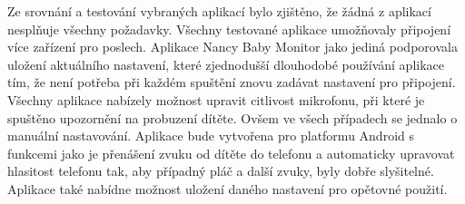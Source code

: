 \documentclass[journal, a4paper]{IEEEtran}
\begin{document}
Ze srovnání a testování vybraných aplikací bylo zjištěno, že žádná z aplikací nesplňuje všechny požadavky. Všechny testované aplikace umožňovaly připojení více zařízení pro poslech. Aplikace Nancy Baby Monitor jako jediná podporovala uložení aktuálního nastavení, které zjednodušší dlouhodobé používání aplikace tím, že není potřeba při každém spuštění znovu zadávat nastavení pro připojení. Všechny aplikace nabízely možnost upravit citlivost mikrofonu, při které je spuštěno upozornění na probuzení dítěte. Ovšem ve všech případech se jednalo o manuální nastavování.
Aplikace bude vytvořena pro platformu Android s funkcemi jako je přenášení zvuku od dítěte do telefonu a automaticky upravovat hlasitost telefonu tak, aby případný pláč a další zvuky, byly dobře slyšitelné. Aplikace také nabídne možnost uložení daného nastavení pro opětovné použití.

\end{document}
